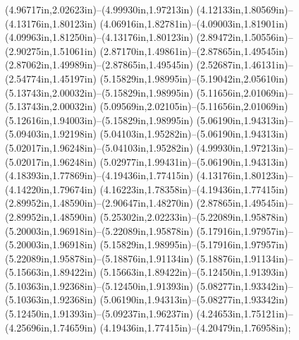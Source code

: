 (4.96717in,2.02623in)--(4.99930in,1.97213in) (4.12133in,1.80569in)--(4.13176in,1.80123in) (4.06916in,1.82781in)--(4.09003in,1.81901in) (4.09963in,1.81250in)--(4.13176in,1.80123in) (2.89472in,1.50556in)--(2.90275in,1.51061in) (2.87170in,1.49861in)--(2.87865in,1.49545in) (2.87062in,1.49989in)--(2.87865in,1.49545in) (2.52687in,1.46131in)--(2.54774in,1.45197in) (5.15829in,1.98995in)--(5.19042in,2.05610in) (5.13743in,2.00032in)--(5.15829in,1.98995in) (5.11656in,2.01069in)--(5.13743in,2.00032in) (5.09569in,2.02105in)--(5.11656in,2.01069in) (5.12616in,1.94003in)--(5.15829in,1.98995in) (5.06190in,1.94313in)--(5.09403in,1.92198in) (5.04103in,1.95282in)--(5.06190in,1.94313in) (5.02017in,1.96248in)--(5.04103in,1.95282in) (4.99930in,1.97213in)--(5.02017in,1.96248in) (5.02977in,1.99431in)--(5.06190in,1.94313in) (4.18393in,1.77869in)--(4.19436in,1.77415in) (4.13176in,1.80123in)--(4.14220in,1.79674in) (4.16223in,1.78358in)--(4.19436in,1.77415in) (2.89952in,1.48590in)--(2.90647in,1.48270in) (2.87865in,1.49545in)--(2.89952in,1.48590in) (5.25302in,2.02233in)--(5.22089in,1.95878in) (5.20003in,1.96918in)--(5.22089in,1.95878in) (5.17916in,1.97957in)--(5.20003in,1.96918in) (5.15829in,1.98995in)--(5.17916in,1.97957in) (5.22089in,1.95878in)--(5.18876in,1.91134in) (5.18876in,1.91134in)--(5.15663in,1.89422in) (5.15663in,1.89422in)--(5.12450in,1.91393in) (5.10363in,1.92368in)--(5.12450in,1.91393in) (5.08277in,1.93342in)--(5.10363in,1.92368in) (5.06190in,1.94313in)--(5.08277in,1.93342in) (5.12450in,1.91393in)--(5.09237in,1.96237in) (4.24653in,1.75121in)--(4.25696in,1.74659in) (4.19436in,1.77415in)--(4.20479in,1.76958in);
